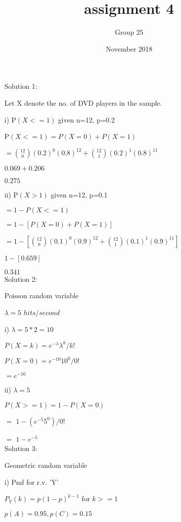 \documentclass{article}
\title{assignment 4}
\author{Group 25}
\date{November 2018}
\begin{document}
\maketitle

Solution 1:

Let X denote the no. of DVD players in the sample.

i) P$\left ( X <= 1 \right )$ given  n=12, p=0.2

P$\left ( X <= 1 \right )= P\left ( X=0 \right ) + P\left ( X=1 \right )$ 

$= \binom{12}{0} \left ( 0.2 \right )^0 \left ( 0.8 \right )^{12} + \binom{12}{1}\left ( 0.2 \right )^1\left ( 0.8 \right )^{11}$

$0.069 + 0.206$

$0.275$


ii) P$\left ( X > 1 \right )$ given  n=12, p=0.1

$= 1-P\left ( X<=1 \right )$

$=1-\left [ P\left ( X=0 \right )+P\left ( X=1 \right ) \right ]$

$=1-\left [ \binom{12}{0} \left ( 0.1 \right )^0 \left ( 0.9 \right )^{12} + \binom{12}{1}\left ( 0.1 \right )^1\left ( 0.9 \right )^{11} \right ]$

$1-\left [ 0.659 \right ]$

$0.341$\\

Solution 2:

Poisson random variable

$\lambda = 5 $ $hits/second$

i) $\lambda = 5*2=10$

$P\left ( X=k \right ) = e^{-\lambda }\lambda ^{k}/k!$

$P\left ( X=0 \right ) = e^{-10}10^{0}/0! $

$= e^{-10}$

ii) $\lambda = 5$

$P\left ( X>=1 \right ) = 1- P\left ( X=0 \right )$

$= $ $1-\left ( e^{-5}5^{0} \right )/0!$

$=$ $ 1-e^{-5}$\\

Solution 3:

Geometric random variable

i) Pmf for r.v. 'Y'

$P_Y\left ( k \right )= p\left ( 1-p \right )^{k-1}$ for $k>=1$

$p\left ( A \right )=0.95, p\left ( 
C \right ) =0.15$
\end{document}
